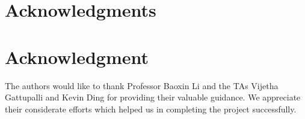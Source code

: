 \documentclass[10pt,journal,compsoc]{IEEEtran}
\begin{document}

%





\ifCLASSOPTIONcompsoc
  \section*{Acknowledgments}
\else
  \section*{Acknowledgment}
\fi

The authors would like to thank Professor Baoxin Li and the TAs Vijetha Gattupalli and Kevin Ding for providing their valuable guidance. 
We appreciate their considerate efforts which helped us in completing the project successfully.
\end{document}
